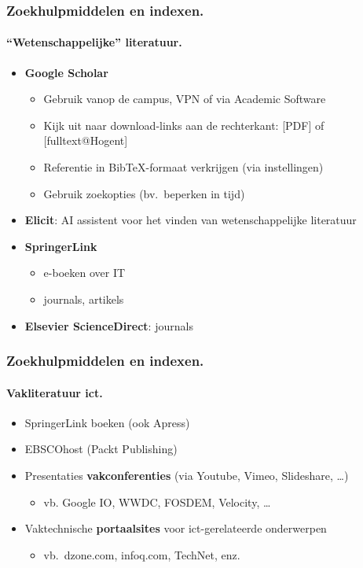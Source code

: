 \documentclass[aspectratio=169]{beamer}
\begin{document}
\begin{frame}
  \frametitle{Zoekhulpmiddelen en indexen.}
  \framesubtitle{``Wetenschappelijke'' literatuur.}

  \begin{itemize}
    \item<+-> \textbf{Google Scholar}
      \begin{itemize}
        \item Gebruik vanop de campus, VPN of via Academic Software
        \item Kijk uit naar download-links aan de rechterkant: [PDF] of [fulltext@Hogent]
        \item Referentie in Bib{\TeX}-formaat verkrijgen (via instellingen)
        \item Gebruik zoekopties (bv.~beperken in tijd)
      \end{itemize}
    \item<+-> \textbf{Elicit}: AI assistent voor het vinden van wetenschappelijke literatuur
    \item<+-> \textbf{SpringerLink}
      \begin{itemize}
        \item e-boeken over IT
        \item journals, artikels
      \end{itemize}
    \item<+-> \textbf{Elsevier ScienceDirect}: journals
  \end{itemize}
\end{frame}

\begin{frame}
  \frametitle{Zoekhulpmiddelen en indexen.}
  \framesubtitle{Vakliteratuur ict.}

  \begin{itemize}
    \item SpringerLink boeken (ook Apress)
    \item EBSCOhost (Packt Publishing)
    \item Presentaties \textbf{vakconferenties} (via Youtube, Vimeo, Slideshare, \dots)
          \begin{itemize}
            \item vb. Google IO, WWDC, FOSDEM, Velocity, \dots
          \end{itemize}
    \item<+-> Vaktechnische \textbf{portaalsites} voor ict-gerelateerde onderwerpen
      \begin{itemize}
        \item vb.~dzone.com, infoq.com, TechNet, enz.
      \end{itemize}
  \end{itemize}
\end{frame}
\end{document}

